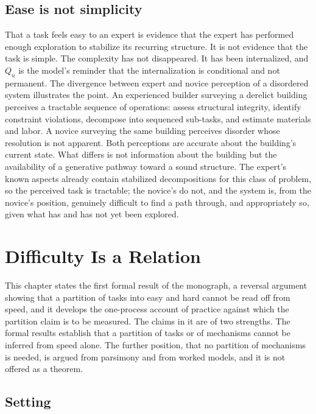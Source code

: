 \documentclass[11pt]{report}
\theoremstyle{remark}
\theoremstyle{definition}
\begin{document}
\section{Ease is not simplicity}

That a task feels easy to an expert is evidence that the expert has performed enough exploration to stabilize its recurring structure. It is not evidence that the task is simple. The complexity has not disappeared. It has been internalized, and $Q_u$ is the model's reminder that the internalization is conditional and not permanent. The divergence between expert and novice perception of a disordered system illustrates the point. An experienced builder surveying a derelict building perceives a tractable sequence of operations: assess structural integrity, identify constraint violations, decompose into sequenced sub-tasks, and estimate materials and labor. A novice surveying the same building perceives disorder whose resolution is not apparent. Both perceptions are accurate about the building's current state. What differs is not information about the building but the availability of a generative pathway toward a sound structure. The expert's known aspects already contain stabilized decompositions for this class of problem, so the perceived task is tractable; the novice's do not, and the system is, from the novice's position, genuinely difficult to find a path through, and appropriately so, given what has and has not yet been explored.

\chapter{Difficulty Is a Relation}\label{ch:difficulty}

This chapter states the first formal result of the monograph, a reversal argument showing that a partition of tasks into easy and hard cannot be read off from speed, and it develops the one-process account of practice against which the partition claim is to be measured. The claims in it are of two strengths. The formal results establish that a partition of tasks or of mechanisms cannot be inferred from speed alone. The further position, that no partition of mechanisms is needed, is argued from parsimony and from worked models, and it is not offered as a theorem.

\section{Setting}
\end{document}
